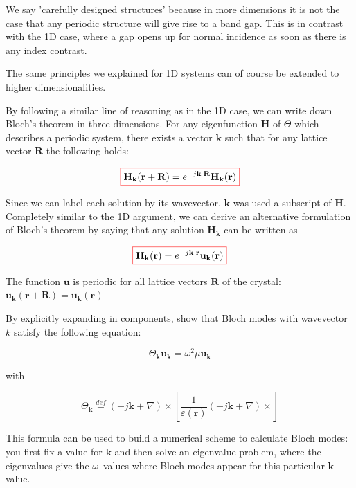 We say 'carefully designed structures' because in more dimensions it is not the case that any periodic structure will give rise to a band gap. This is in contrast with the 1D case, where a gap opens up for normal incidence as soon as there is any index contrast.

\pagebreak


The same principles we explained for 1D systems can of course be extended to higher dimensionalities.

By following a similar line of reasoning as in the 1D case, we can write down Bloch's theorem in three dimensions. For any eigenfunction ${\mathbf H}$ of $\Theta$ which describes a periodic system, there exists a vector ${\mathbf k}$ such that for any lattice vector ${\mathbf R}$ the following holds:

\begin{equation}
\fbox{$\displaystyle
{\mathbf H}_{\mathbf k} ({\mathbf r}+ {\mathbf R}) = e^{-j {\mathbf k} \cdot {\mathbf R}} {\mathbf H}_{\mathbf k} ({\mathbf r})
$}
\end{equation} 

Since we can label each solution by its wavevector, ${\mathbf k}$ was used a subscript of ${\mathbf H}$. 
Completely similar to the 1D argument, we can derive an alternative formulation of Bloch's theorem by saying that any solution ${\mathbf H}_{\mathbf k}$ can be written as

\begin{equation}
\fbox{$\displaystyle
{\mathbf H}_{\mathbf k} ({\mathbf r}) = e^{-j {\mathbf k} \cdot {\mathbf r}} {\mathbf u}_{\mathbf k} ({\mathbf r})
$}
\end{equation} 

The function ${\mathbf u}$ is periodic for all lattice vectors ${\mathbf R}$ of the crystal: ${\mathbf u}_{\mathbf k} ({\mathbf r} + {\mathbf R})  = {\mathbf u}_{\mathbf k} ({\mathbf r})$


\begin{exer}
By explicitly expanding in components, show that Bloch modes with wavevector $k$ satisfy the following equation:

$$\Theta_{\mathbf k} {\mathbf u}_{\mathbf k} = \omega^2 \mu {\mathbf u}_{\mathbf k}$$

with

$$\Theta_{\mathbf k} \stackrel{def}{=} (-j {\mathbf k} + \nabla) \times \left [ \frac{1}{\varepsilon({\mathbf r})}(-j{\mathbf k} +\nabla) \times \right ]$$

This formula can be used to build a numerical scheme to calculate Bloch modes: you first fix a value for ${\mathbf k}$ and then solve an eigenvalue problem, where the eigenvalues give the $\omega$--values where Bloch modes appear for this particular ${\mathbf k}$--value.

\end{exer}


